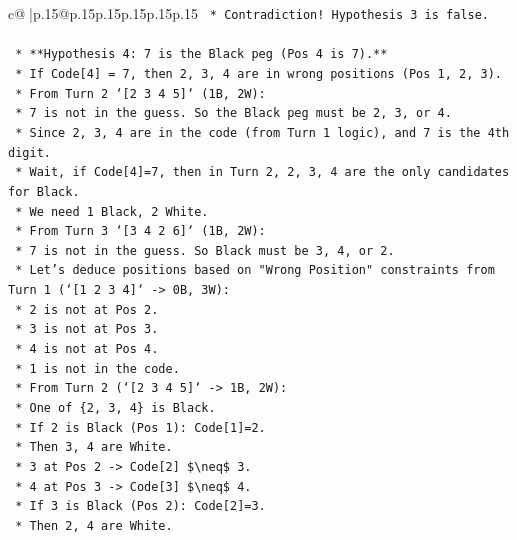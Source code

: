 \documentclass{article}
\begin{document}
{\begin{supertabular}{c@{$\;$}|p{.15\linewidth}@{}p{.15\linewidth}p{.15\linewidth}p{.15\linewidth}p{.15\linewidth}p{.15\linewidth}}
{{{\texttt{                    *   Contradiction! Hypothesis 3 is false.} \\
\\ 
\texttt{    *   **Hypothesis 4: 7 is the Black peg (Pos 4 is 7).**} \\
\texttt{        *   If Code{[}4{]} = 7, then 2, 3, 4 are in wrong positions (Pos 1, 2, 3).} \\
\texttt{        *   From Turn 2 `{[}2 3 4 5{]}` (1B, 2W):} \\
\texttt{            *   7 is not in the guess. So the Black peg must be 2, 3, or 4.} \\
\texttt{            *   Since 2, 3, 4 are in the code (from Turn 1 logic), and 7 is the 4th digit.} \\
\texttt{            *   Wait, if Code{[}4{]}=7, then in Turn 2, 2, 3, 4 are the only candidates for Black.} \\
\texttt{            *   We need 1 Black, 2 White.} \\
\texttt{            *   From Turn 3 `{[}3 4 2 6{]}` (1B, 2W):} \\
\texttt{                *   7 is not in the guess. So Black must be 3, 4, or 2.} \\
\texttt{        *   Let's deduce positions based on "Wrong Position" constraints from Turn 1 (`{[}1 2 3 4{]}` {-}> 0B, 3W):} \\
\texttt{            *   2 is not at Pos 2.} \\
\texttt{            *   3 is not at Pos 3.} \\
\texttt{            *   4 is not at Pos 4.} \\
\texttt{            *   1 is not in the code.} \\
\texttt{        *   From Turn 2 (`{[}2 3 4 5{]}` {-}> 1B, 2W):} \\
\texttt{            *   One of \{2, 3, 4\} is Black.} \\
\texttt{            *   If 2 is Black (Pos 1): Code{[}1{]}=2.} \\
\texttt{                *   Then 3, 4 are White.} \\
\texttt{                *   3 at Pos 2 {-}> Code{[}2{]} \$\textbackslash{}neq\$ 3.} \\
\texttt{                *   4 at Pos 3 {-}> Code{[}3{]} \$\textbackslash{}neq\$ 4.} \\
\texttt{            *   If 3 is Black (Pos 2): Code{[}2{]}=3.} \\
\texttt{                *   Then 2, 4 are White.} \\
}}}
\end{supertabular}}
\end{document}

